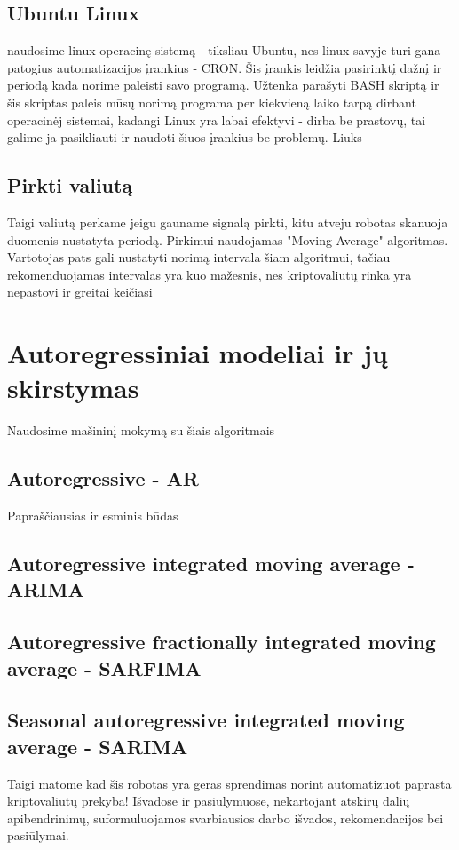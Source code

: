 \documentclass{VUMIFInfKursinis}
\begin{document}
\subsection{Ubuntu Linux}
naudosime linux operacinę sistemą - tiksliau Ubuntu, nes linux savyje turi gana patogius automatizacijos įrankius - CRON. Šis įrankis leidžia pasirinktį dažnį 
ir periodą kada norime paleisti savo programą. Užtenka parašyti BASH skriptą 
ir šis skriptas paleis mūsų norimą programa per kiekvieną laiko tarpą dirbant
operacinėj sistemai, kadangi Linux yra labai efektyvi - dirba be prastovų,
tai galime ja pasikliauti ir naudoti šiuos įrankius be problemų. Liuks
\subsection{Pirkti valiutą}
Taigi valiutą perkame jeigu gauname signalą pirkti, kitu atveju robotas skanuoja duomenis nustatyta periodą. Pirkimui naudojamas "Moving Average" algoritmas. 
Vartotojas pats gali nustatyti norimą intervala šiam algoritmui, tačiau rekomenduojamas intervalas yra kuo mažesnis, nes kriptovaliutų rinka 
yra nepastovi ir greitai keičiasi 

\section{Autoregressiniai modeliai ir jų skirstymas}
Naudosime mašininį mokymą su šiais algoritmais
\subsection{Autoregressive - AR}
Papraščiausias ir esminis būdas
\subsection{Autoregressive integrated moving average - ARIMA}

\subsection{Autoregressive fractionally integrated moving average - SARFIMA}

\subsection{Seasonal autoregressive integrated moving average - SARIMA}


Taigi matome kad šis robotas yra geras sprendimas norint automatizuot paprasta kriptovaliutų prekyba!
Išvadose ir pasiūlymuose, nekartojant atskirų dalių apibendrinimų,
suformuluojamos svarbiausios darbo išvados, rekomendacijos bei pasiūlymai.
\end{document}
